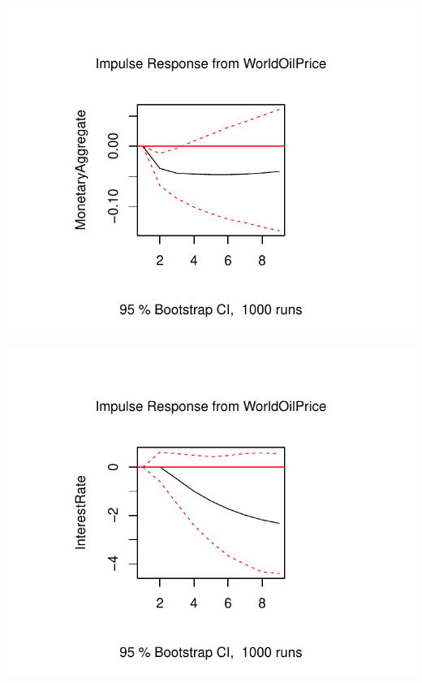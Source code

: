 \documentclass[11pt,preprint, authoryear]{elsarticle}
\numberwithin{equation}{section}
\numberwithin{figure}{section}
\numberwithin{table}{section}
\begin{document}
\begin{center}\includegraphics{README_files/figure-latex/unnamed-chunk-13-1} \end{center}

\begin{center}\includegraphics{README_files/figure-latex/unnamed-chunk-13-2} \end{center}
\end{document}

